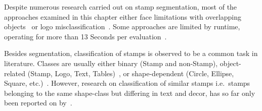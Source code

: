 Despite numerous research carried out on stamp segmentation, most of the 
approaches examined in this chapter either face limitations with overlapping 
objects~\cite{Nandedkar.2015, Nandedkar.2015b, 
Forczmanski.2016, Ahmed.2013, Dey.2015, 
Forczmanski.2015, Forczmanski.2016} or logo misclassification~\cite
{Ahmed.2013, Dey.2015,Micenkova.2011}. Some
approaches are limited by runtime, operating for more than 13 Seconds per
evaluation~\cite{Ahmed.2016,Nandedkar.2015}.
\par
Besides segmentation, classification of stamps is observed to be a common task 
in literature. Classes are usually either binary (Stamp and non-Stamp), 
object-related (Stamp, Logo, Text, Tables)~\cite{Forczmanski.2016,
Nandedkar.2015, Nandedkar.2015b, Dey.2015},
or shape-dependent (Circle, Ellipse, Square, etc.)~\cite{Forczmanski.2015}.
However, research on classification of similar stamps i.e.\ stamps belonging to
the same shape-class but differing in text and decor, has so far only been
reported on by~\cite{Petej.2013070720130710}.
